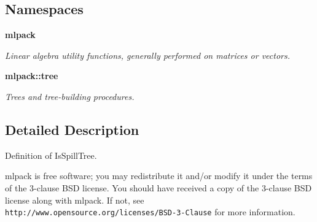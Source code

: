 \subsection*{Namespaces}
\begin{DoxyCompactItemize}
\item 
 \textbf{ mlpack}
\begin{DoxyCompactList}\small\item\em Linear algebra utility functions, generally performed on matrices or vectors. \end{DoxyCompactList}\item 
 \textbf{ mlpack\+::tree}
\begin{DoxyCompactList}\small\item\em Trees and tree-\/building procedures. \end{DoxyCompactList}\end{DoxyCompactItemize}


\subsection{Detailed Description}
Definition of Is\+Spill\+Tree. 

mlpack is free software; you may redistribute it and/or modify it under the terms of the 3-\/clause B\+SD license. You should have received a copy of the 3-\/clause B\+SD license along with mlpack. If not, see {\tt http\+://www.\+opensource.\+org/licenses/\+B\+S\+D-\/3-\/\+Clause} for more information. 